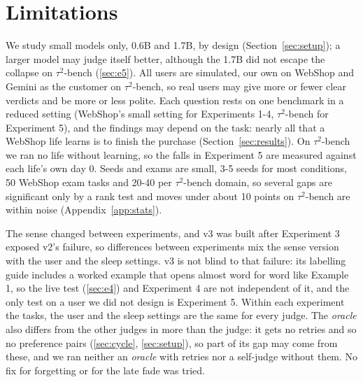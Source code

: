 \section{Limitations}\label{sec:limitations}

We study small models only, 0.6B and 1.7B, by design (Section~\ref{sec:setup}); a larger model may judge itself better, although the 1.7B did not escape the collapse on $\tau^2$-bench (\ref{sec:e5}). All users are simulated, our own on WebShop and Gemini as the customer on $\tau^2$-bench, so real users may give more or fewer clear verdicts and be more or less polite. Each question rests on one benchmark in a reduced setting (WebShop's small setting for Experiments 1-4, $\tau^2$-bench for Experiment 5), and the findings may depend on the task: nearly all that a WebShop life learns is to finish the purchase (Section~\ref{sec:results}). On $\tau^2$-bench we ran no life without learning, so the falls in Experiment 5 are measured against each life's own day 0. Seeds and exams are small, 3-5 seeds for most conditions, 50 WebShop exam tasks and 20-40 per $\tau^2$-bench domain, so several gaps are significant only by a rank test and moves under about 10 points on $\tau^2$-bench are within noise (Appendix~\ref{app:stats}).

The sense changed between experiments, and v3 was built after Experiment 3 exposed v2's failure, so differences between experiments mix the sense version with the user and the sleep settings. v3 is not blind to that failure: its labelling guide includes a worked example that opens almost word for word like Example 1, so the live test (\ref{sec:e4}) and Experiment 4 are not independent of it, and the only test on a user we did not design is Experiment 5. Within each experiment the tasks, the user and the sleep settings are the same for every judge. The \emph{oracle} also differs from the other judges in more than the judge: it gets no retries and so no preference pairs (\ref{sec:cycle}, \ref{sec:setup}), so part of its gap may come from these, and we ran neither an \emph{oracle} with retries nor a self-judge without them. No fix for forgetting or for the late fade was tried.
